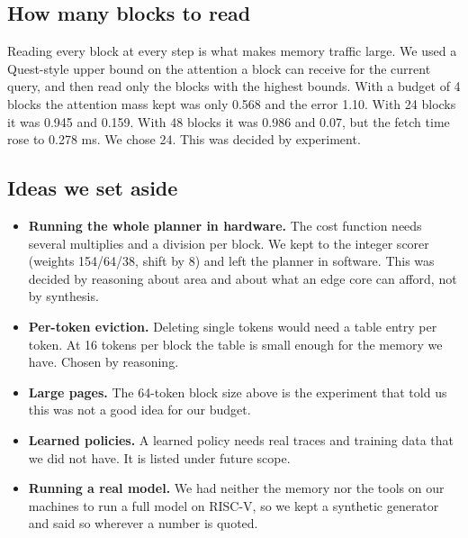 \documentclass[12pt,a4paper]{report}
\begin{document}
\subsection{How many blocks to read}
Reading every block at every step is what makes memory traffic large. We used a Quest-style upper bound on the attention a block can receive for the current query, and then read only the blocks with the highest bounds. With a budget of 4 blocks the attention mass kept was only 0.568 and the error 1.10. With 24 blocks it was 0.945 and 0.159. With 48 blocks it was 0.986 and 0.07, but the fetch time rose to 0.278 ms. We chose 24. This was decided by experiment.

\subsection{Ideas we set aside}
\begin{itemize}
\item \textbf{Running the whole planner in hardware.} The cost function needs several multiplies and a division per block. We kept to the integer scorer (weights 154/64/38, shift by 8) and left the planner in software. This was decided by reasoning about area and about what an edge core can afford, not by synthesis.
\item \textbf{Per-token eviction.} Deleting single tokens would need a table entry per token. At 16 tokens per block the table is small enough for the memory we have. Chosen by reasoning.
\item \textbf{Large pages.} The 64-token block size above is the experiment that told us this was not a good idea for our budget.
\item \textbf{Learned policies.} A learned policy needs real traces and training data that we did not have. It is listed under future scope.
\item \textbf{Running a real model.} We had neither the memory nor the tools on our machines to run a full model on RISC-V, so we kept a synthetic generator and said so wherever a number is quoted.
\end{itemize}
\end{document}
